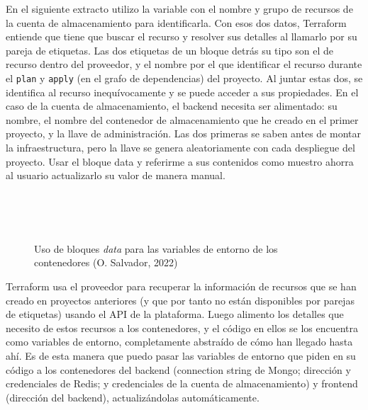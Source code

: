 \documentclass[11pt]{article}
\begin{document}
\begin{flushleft}
	En el siguiente extracto utilizo la variable con el nombre y grupo de recursos de la cuenta de almacenamiento para identificarla. Con esos dos datos, Terraform entiende que tiene que buscar el recurso y resolver sus detalles al llamarlo por su pareja de etiquetas. Las dos etiquetas de un bloque detrás su tipo son el de recurso dentro del proveedor, y el nombre por el que identificar el recurso durante el \texttt{plan} y \texttt{apply} (en el grafo de dependencias) del proyecto. Al juntar estas dos, se identifica al recurso inequívocamente y se puede acceder a sus propiedades. En el caso de la cuenta de almacenamiento, el backend necesita ser alimentado: su nombre, el nombre del contenedor de almacenamiento que he creado en el primer proyecto, y la llave de administración. Las dos primeras se saben antes de montar la infraestructura, pero la llave se genera aleatoriamente con cada despliegue del proyecto. Usar el bloque data y referirme a sus contenidos como muestro ahorra al usuario actualizarlo su valor de manera manual.
	\linebreak
	
		\begin{figure}[htb]
			\centering
			\begin{subfigure}{0.7\textwidth}
				\inputminted[fontsize=\scriptsize, firstline=6, lastline=9, linenos, frame=single, breaklines]{dockerfile}{../../backend/terraform/main.tf}
				\inputminted[fontsize=\scriptsize, firstline=21, lastline=21, linenos, frame=single, breaklines]{dockerfile}{../../backend/terraform/main.tf}
				\inputminted[fontsize=\scriptsize, firstline=45, lastline=45, linenos, frame=single, breaklines]{dockerfile}{../../backend/terraform/main.tf}
				\inputminted[fontsize=\scriptsize, firstline=51, lastline=51, linenos, frame=single, breaklines]{dockerfile}{../../backend/terraform/main.tf}
				\inputminted[fontsize=\scriptsize, firstline=56, lastline=59, linenos, frame=single, breaklines]{dockerfile}{../../backend/terraform/main.tf}
			\end{subfigure}
			\caption{Uso de bloques \textit{data} para las variables de entorno de los contenedores (O. Salvador, 2022)}
		\end{figure}
	
	Terraform usa el proveedor para recuperar la información de recursos que se han creado en proyectos anteriores (y que por tanto no están disponibles por parejas de etiquetas) usando el API de la plataforma. Luego alimento los detalles que necesito de estos recursos a los contenedores, y el código en ellos se los encuentra como variables de entorno, completamente abstraído de cómo han llegado hasta ahí. Es de esta manera que puedo pasar las variables de entorno que piden en su código a los contenedores del backend (connection string de Mongo; dirección y credenciales de Redis; y credenciales de la cuenta de almacenamiento) y frontend (dirección del backend), actualizándolas automáticamente.
	\linebreak
	

\end{flushleft}
\end{document}
